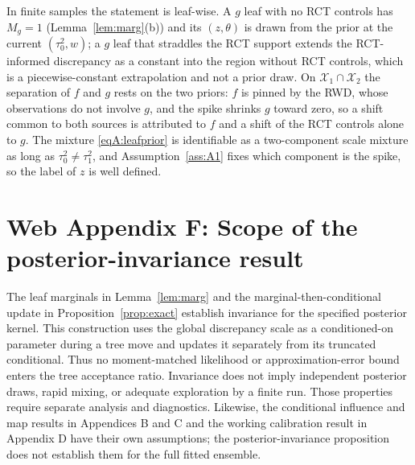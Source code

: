 \begin{remA}\label{rem:identfinite}
In finite samples the statement is leaf-wise. A $g$ leaf with no RCT controls has $M_g=1$ (Lemma~\ref{lem:marg}(b)) and its $(z,\theta)$ is drawn from the prior at the current $(\tau_0^2,w)$; a $g$ leaf that straddles the RCT support extends the RCT-informed discrepancy as a constant into the region without RCT controls, which is a piecewise-constant extrapolation and not a prior draw. On $\mathcal X_1\cap\mathcal X_2$ the separation of $f$ and $g$ rests on the two priors: $f$ is pinned by the RWD, whose observations do not involve $g$, and the spike shrinks $g$ toward zero, so a shift common to both sources is attributed to $f$ and a shift of the RCT controls alone to $g$. The mixture \eqref{eqA:leafprior} is identifiable as a two-component scale mixture as long as $\tau_0^2\ne\tau_1^2$, and Assumption~\ref{ass:A1} fixes which component is the spike, so the label of $z$ is well defined.
\end{remA}

\section*{Web Appendix F: Scope of the posterior-invariance result}

The leaf marginals in Lemma~\ref{lem:marg} and the marginal-then-conditional update in Proposition~\ref{prop:exact} establish invariance for the specified posterior kernel. This construction uses the global discrepancy scale as a conditioned-on parameter during a tree move and updates it separately from its truncated conditional. Thus no moment-matched likelihood or approximation-error bound enters the tree acceptance ratio. Invariance does not imply independent posterior draws, rapid mixing, or adequate exploration by a finite run. Those properties require separate analysis and diagnostics. Likewise, the conditional influence and map results in Appendices B and C and the working calibration result in Appendix D have their own assumptions; the posterior-invariance proposition does not establish them for the full fitted ensemble.
